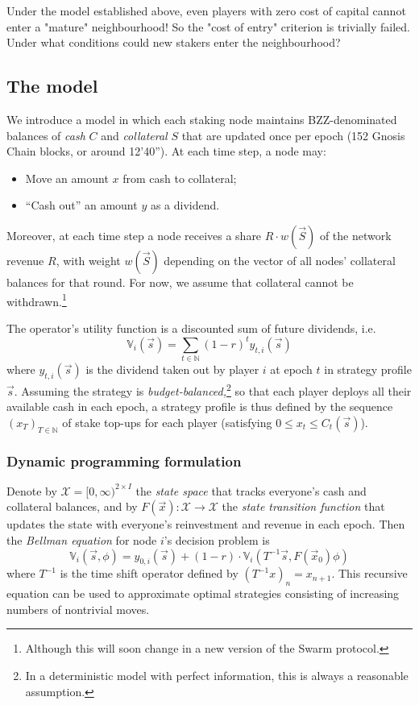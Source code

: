 Under the model established above, even players with zero cost of capital cannot enter a "mature" neighbourhood! So the "cost of entry" criterion is trivially failed. Under what conditions could new stakers enter the neighbourhood?

\subsection*{The model}

We introduce a model in which each staking node maintains BZZ-denominated balances of \emph{cash} $C$ and \emph{collateral} $S$ that are updated once per epoch (152 Gnosis Chain blocks, or around 12'40''). At each time step, a node may:

\begin{itemize}
\item Move an amount $x$ from cash to collateral;
\item ``Cash out'' an amount $y$ as a dividend.
\end{itemize}

Moreover, at each time step a node receives a share $R\cdot w(\vec{S})$ of the network revenue $R$, with weight $w(\vec{S})$ depending on the vector of all nodes' collateral balances for that round. For now, we assume that collateral cannot be withdrawn.\footnote{Although this will soon change in a new version of the Swarm protocol.}

The operator's utility function is a discounted sum of future dividends, i.e.
\[
  \mathbb{V}_i(\vec{s}) = \sum_{t\in\mathbb{N}}(1-r)^t y_{t,i}(\vec{s})
\]
where $y_{t,i}(\vec{s})$ is the dividend taken out by player $i$ at epoch $t$ in strategy profile $\vec{s}$. Assuming the strategy is \emph{budget-balanced,}\footnote{In a deterministic model with perfect information, this is always a reasonable assumption.} so that each player deploys all their available cash in each epoch, a strategy profile is thus defined by the sequence $(x_T)_{T\in\mathbb{N}}$ of stake top-ups for each player (satisfying $0\leq x_t\leq C_t(\vec{s})$).

\subsubsection*{Dynamic programming formulation}

Denote by $\mathcal{X} = [0,\infty)^{2\times I}$ the \emph{state space} that tracks everyone's cash and collateral balances, and by $F(\vec{x}):\mathcal{X}\rightarrow\mathcal{X}$ the \emph{state transition function} that updates the state with everyone's reinvestment and revenue in each epoch. Then the \emph{Bellman equation} for node $i$'s decision problem is
%
\begin{equation}
  \mathbb{V}_i(\vec{s},\phi) = y_{0,i}(\vec{s}) + 
    (1-r)\cdot\mathbb{V}_i(T^{-1}\vec{s}, F(\vec{x}_0)\phi)
\end{equation}
%
where $T^{-1}$ is the time shift operator defined by $(T^{-1}x)_n = x_{n+1}$. This recursive equation can be used to approximate optimal strategies consisting of increasing numbers of nontrivial moves.

